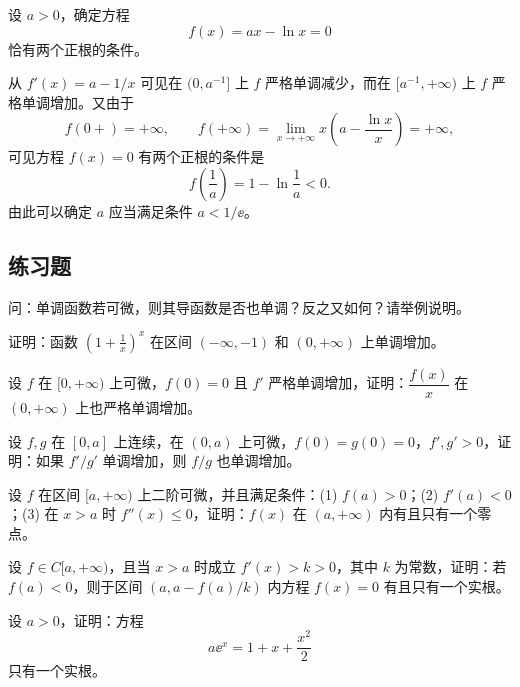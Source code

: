 \begin{xexample}[8.2.5]
设 $a>0$，确定方程
\[
  f(x)=ax-\ln x=0
\]
恰有两个正根的条件。
\end{xexample}
\begin{xsolution}
从 $f'(x)=a-1/x$ 可见在 $(0,a^{-1}]$ 上 $f$ 严格单调减少，而在 $[a^{-1},+\infty)$ 上 $f$ 严格单调增加。又由于
\[
  f(0+)=+\infty,\qquad
  f(+\infty)=\lim_{x\to+\infty}x\left(a-\frac{\ln x}{x}\right)=+\infty,
\]
可见方程 $f(x)=0$ 有两个正根的条件是
\[
  f\left(\frac1a\right)=1-\ln\frac1a<0.
\]
由此可以确定 $a$ 应当满足条件 $a<1/\ee$。
\end{xsolution}

\subsection{练习题}

\begin{xexercise}[1]
问：单调函数若可微，则其导函数是否也单调？反之又如何？请举例说明。
\end{xexercise}

\begin{xexercise}[2]
证明：函数 $\left(1+\frac1x\right)^x$ 在区间 $(-\infty,-1)$ 和 $(0,+\infty)$ 上单调增加。
\end{xexercise}

\begin{xexercise}[3]
设 $f$ 在 $[0,+\infty)$ 上可微，$f(0)=0$ 且 $f'$ 严格单调增加，证明：$\dfrac{f(x)}x$ 在 $(0,+\infty)$ 上也严格单调增加。
\end{xexercise}

\begin{xexercise}[4]
设 $f,g$ 在 $[0,a]$ 上连续，在 $(0,a)$ 上可微，$f(0)=g(0)=0$，$f',g'>0$，证明：如果 $f'/g'$ 单调增加，则 $f/g$ 也单调增加。
\end{xexercise}

\begin{xexercise}[5]
设 $f$ 在区间 $[a,+\infty)$ 上二阶可微，并且满足条件：(1) $f(a)>0$；(2) $f'(a)<0$；(3) 在 $x>a$ 时 $f''(x)\le0$，证明：$f(x)$ 在 $(a,+\infty)$ 内有且只有一个零点。
\end{xexercise}

\begin{xexercise}[6]
设 $f\in C[a,+\infty)$，且当 $x>a$ 时成立 $f'(x)>k>0$，其中 $k$ 为常数，证明：若 $f(a)<0$，则于区间 $(a,a-f(a)/k)$ 内方程 $f(x)=0$ 有且只有一个实根。
\end{xexercise}

\begin{xexercise}[7]
设 $a>0$，证明：方程
  \[
    a\ee^x=1+x+\frac{x^2}{2}
  \]
  只有一个实根。
\end{xexercise}

